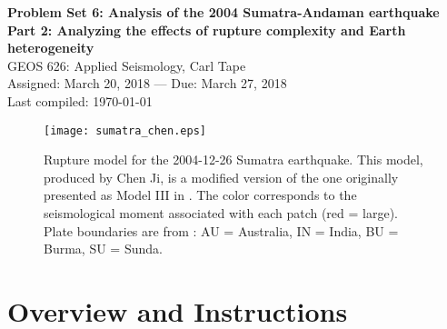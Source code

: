 \documentclass[11pt,titlepage,fleqn]{article}
\begin{document}

\begin{spacing}{1.2} 
\centering
{\large \bf Problem Set 6: Analysis of the 2004 Sumatra-Andaman earthquake \\
Part 2: Analyzing the effects of rupture complexity and Earth heterogeneity } \\
GEOS 626: Applied Seismology, Carl Tape \\
Assigned: March 20, 2018 --- Due: March 27, 2018 \\
Last compiled: \today
\end{spacing}


\begin{figure}[h]
\centering
\texttt{[image: sumatra\_chen.eps]}
\caption[]
{{
Rupture model for the 2004-12-26  Sumatra earthquake.
This model, produced by Chen Ji, is a modified version of the one originally presented as Model III in \citet[][Figure~5c]{Ammon2005}.
The color corresponds to the seismological moment associated with each patch (red = large).
Plate boundaries are from \citet{Bird2003}: AU = Australia, IN = India, BU = Burma, SU = Sunda.
}}
\label{fig:sumatra_chen}
\end{figure}


\clearpage\pagebreak
\section*{Overview and Instructions}
\end{document}
